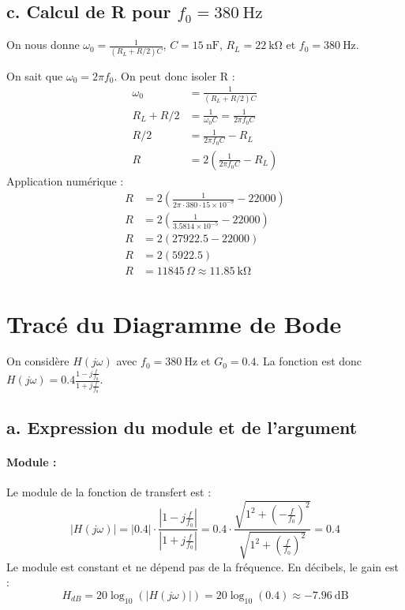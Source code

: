 \documentclass[12pt,a4paper]{article}
\begin{document}
\subsection*{c. Calcul de R pour \(f_0 = \SI{380}{\hertz}\)}
On nous donne \(\omega_0 = \frac{1}{(R_L + R/2)C}\), \(C = \SI{15}{\nano\farad}\), \(R_L = \SI{22}{\kilo\ohm}\) et \(f_0 = \SI{380}{\hertz}\).

On sait que \(\omega_0 = 2\pi f_0\). On peut donc isoler R :
\begin{align*}
    \omega_0 &= \frac{1}{(R_L + R/2)C} \\
    R_L + R/2 &= \frac{1}{\omega_0 C} = \frac{1}{2\pi f_0 C} \\
    R/2 &= \frac{1}{2\pi f_0 C} - R_L \\
    R &= 2 \left( \frac{1}{2\pi f_0 C} - R_L \right)
\end{align*}
Application numérique :
\begin{align*}
    R &= 2 \left( \frac{1}{2\pi \cdot 380 \cdot 15 \times 10^{-9}} - 22000 \right) \\
    R &= 2 \left( \frac{1}{3.5814 \times 10^{-5}} - 22000 \right) \\
    R &= 2 \left( 27922.5 - 22000 \right) \\
    R &= 2 \left( 5922.5 \right) \\
    R &= 11845 \, \Omega \approx \SI{11.85}{\kilo\ohm}
\end{align*}

\section{Tracé du Diagramme de Bode}
On considère \(H(j\omega)\) avec \(f_0 = \SI{380}{\hertz}\) et \(G_0 = 0.4\).
La fonction est donc \(H(j\omega) = 0.4 \frac{1 - j\frac{f}{f_0}}{1 + j\frac{f}{f_0}}\).

\subsection*{a. Expression du module et de l'argument}
\paragraph{Module :}
Le module de la fonction de transfert est :
\begin{equation}
    |H(j\omega)| = |0.4| \cdot \frac{|1 - j\frac{f}{f_0}|}{|1 + j\frac{f}{f_0}|} = 0.4 \cdot \frac{\sqrt{1^2 + (-\frac{f}{f_0})^2}}{\sqrt{1^2 + (\frac{f}{f_0})^2}} = 0.4
\end{equation}
Le module est constant et ne dépend pas de la fréquence.
En décibels, le gain est :
\begin{equation}
    H_{dB} = 20 \log_{10}(|H(j\omega)|) = 20 \log_{10}(0.4) \approx \SI{-7.96}{\deci\bel}
\end{equation}
\end{document}
